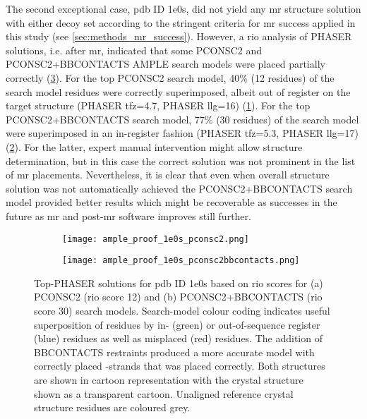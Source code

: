 The second exceptional case, \gls{pdb} ID 1e0s, did not yield any \gls{mr} structure solution with either decoy set according to the stringent criteria for \gls{mr} success applied in this study (see \cref{sec:methods_mr_success}). However, a \gls{rio} analysis of PHASER solutions, i.e. after \gls{mr}, indicated that some PCONSC2 and PCONSC2+BBCONTACTS AMPLE search models were placed partially correctly (\cref{fig:ample_proof_example_1e0s}). For the top PCONSC2 search model, 40\% (12 residues) of the search model residues were correctly superimposed, albeit out of register on the target structure (PHASER \gls{tfz}=4.7, PHASER \gls{llg}=16) (\cref{fig:ample_proof_1e0s_pconsc2}). For the top PCONSC2+BBCONTACTS search model, 77\% (30 residues) of the search model were superimposed in an in-register fashion (PHASER \gls{tfz}=5.3, PHASER \gls{llg}=17) (\cref{fig:ample_proof_1e0s_pconsc2bbcontacts}). For the latter, expert manual intervention might allow structure determination, but in this case the correct solution was not prominent in the list of \gls{mr} placements. Nevertheless, it is clear that even when overall structure solution was not automatically achieved the PCONSC2+BBCONTACTS search model provided better results which might be recoverable as successes in the future as \gls{mr} and post-\gls{mr} software improves still further.

\begin{figure}[H]
    \centering
    \begin{subfigure}[b]{0.48\textwidth}
        \centering
        \texttt{[image: ample\_proof\_1e0s\_pconsc2.png]}
        \caption{}
        \label{fig:ample_proof_1e0s_pconsc2}
    \end{subfigure}
    \begin{subfigure}[b]{0.48\textwidth}
        \centering
        \texttt{[image: ample\_proof\_1e0s\_pconsc2bbcontacts.png]}
        \caption{}
        \label{fig:ample_proof_1e0s_pconsc2bbcontacts}
    \end{subfigure}

    \caption[Top-PHASER solutions for target 1e0s]{Top-PHASER solutions for \gls{pdb} ID 1e0s based on \gls{rio} scores for (a) PCONSC2 (\gls{rio} score 12) and (b) PCONSC2+BBCONTACTS (\gls{rio} score 30) search models. Search-model colour coding indicates useful superposition of residues by in- (green) or out-of-sequence register (blue) residues as well as misplaced (red) residues. The addition of BBCONTACTS restraints produced a more accurate model with correctly placed \textbeta-strands that was placed correctly. Both structures are shown in cartoon representation with the crystal structure shown as a transparent cartoon. Unaligned reference crystal structure residues are coloured grey.}
    \label{fig:ample_proof_example_1e0s}
\end{figure}

